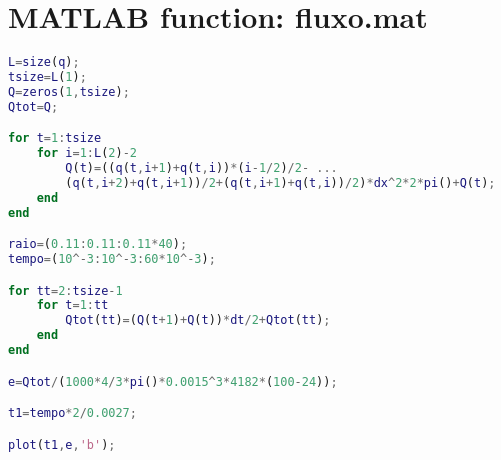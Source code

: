 \chapter{MATLAB function: fluxo.mat}
\label{ap:d}
\begin{lstlisting}[language=matlab]
% Initialization (variables from fluxo.mat)
L=size(q);
tsize=L(1);
Q=zeros(1,tsize);
Qtot=Q;

for t=1:tsize
    for i=1:L(2)-2
        Q(t)=((q(t,i+1)+q(t,i))*(i-1/2)/2- ...
        (q(t,i+2)+q(t,i+1))/2+(q(t,i+1)+q(t,i))/2)*dx^2*2*pi()+Q(t);
    end
end

raio=(0.11:0.11:0.11*40);
tempo=(10^-3:10^-3:60*10^-3);

for tt=2:tsize-1
    for t=1:tt
        Qtot(tt)=(Q(t+1)+Q(t))*dt/2+Qtot(tt);
    end
end

e=Qtot/(1000*4/3*pi()*0.0015^3*4182*(100-24));

t1=tempo*2/0.0027;

plot(t1,e,'b');
\end{lstlisting}